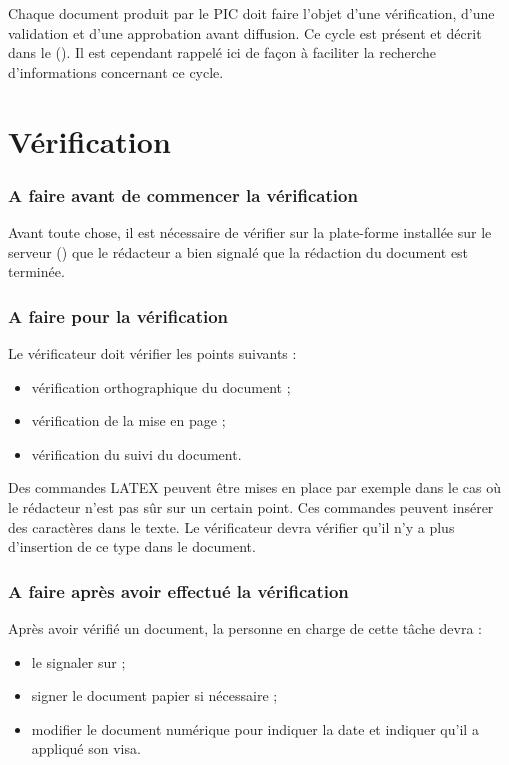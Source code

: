 Chaque document produit par le PIC doit faire l'objet d'une vérification, d'une validation
et d'une approbation avant diffusion. Ce cycle est présent et décrit dans le \PGC (\PGCCourt). Il est cependant rappelé ici de façon à faciliter la recherche d'informations concernant ce cycle.

\section{Vérification}

\subsubsection*{A faire avant de commencer la vérification}
Avant toute chose, il est nécessaire de vérifier sur la plate-forme installée sur le serveur
(\lintranet) que le rédacteur a bien signalé que la rédaction du document est terminée.

\subsubsection*{A faire pour la vérification}
Le vérificateur doit vérifier les points suivants :
\begin{itemize}
\item vérification orthographique du document ;
\item vérification de la mise en page ;
\item vérification du suivi du document.
\end{itemize}
Des commandes LATEX peuvent être mises en place par exemple dans le cas où le rédacteur
n'est pas sûr sur un certain point. Ces commandes peuvent insérer des caractères dans le texte.
Le vérificateur devra vérifier qu'il n'y a plus d'insertion de ce type dans le document.

\subsubsection*{A faire après avoir effectué la vérification}

Après avoir vérifié un document, la personne en charge de cette tâche devra :
\begin{itemize}
\item le signaler sur \lintranet ;
\item signer le document papier si nécessaire ;
\item modifier le document numérique pour indiquer la date et indiquer qu'il a appliqué son
visa.
\end{itemize}

